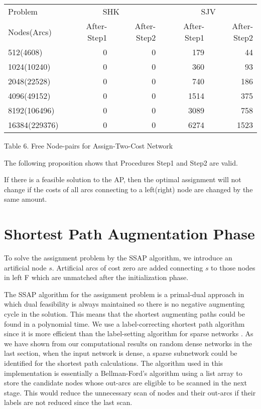 \vskip 5pt
{\small
\begin{tabular}{|l|rr|rr|} \hline
 Problem & \multicolumn{2}{c|}{SHK}& \multicolumn{2}{c|}{SJV}\\
Nodes(Arcs)&After-Step1 &After-Step2 &After-Step1 &After-Step2\\ \hline
512(4608)& 0& 0& 179& 44\\  
1024(10240)& 0& 0& 360& 93\\ 
2048(22528)& 0& 0& 740& 186\\ 
4096(49152)& 0& 0& 1514& 375\\ 
8192(106496)& 0& 0& 3089& 758\\ 
16384(229376)& 0& 0& 6274& 1523\\ \hline
\end{tabular}
}

\vskip 2pt
{Table 6. Free Node-pairs for Assign-Two-Cost Network}
\vskip 5pt

The following proposition shows that Procedures Step1 and Step2 are valid.

 If there is a feasible solution to the
AP, then
the optimal assignment will not change if the costs of all arcs connecting
to a left(right) node are changed by the same amount.
\bull

\section{ Shortest Path Augmentation Phase}

To solve the assignment problem by the SSAP algorithm, we introduce an
artificial node $s$. Artificial arcs of cost zero are added connecting
$s$ to those nodes in left F which are unmatched after the
initialization phase. 

The SSAP algorithm for the assignment problem is a primal-dual
approach in which dual feasibility is always maintained so there is no
negative augmenting cycle in the solution.  This means that the 
shortest augmenting paths could be found in a polynomial time. We use
a label-correcting shortest path algorithm since it is more efficient
than the label-setting algorithm for sparse networks \cite{orl1}. As
we have shown from our computational results on random dense networks
in the last section, when the input network is dense, 
a sparse subnetwork could be identified for the shortest path calculations.
The algorithm used in this implementation
is essentially a Bellman-Ford's algorithm 
\cite{bel1} \cite{for1}
using a list array to store the candidate nodes whose out-arcs
are eligible to be scanned in the next stage. This would
reduce the unnecessary scan of nodes and their out-arcs if 
their labels are not reduced since the last scan.

